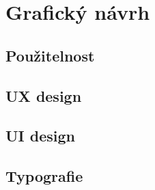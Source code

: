 \chapter{Grafický návrh}

\blindtext

\section{Použitelnost}
\blindtext[1]

\section{UX design}
\blindtext[1]

\section{UI design}
\blindtext[1]

\section{Typografie}
\blindtext[1]
